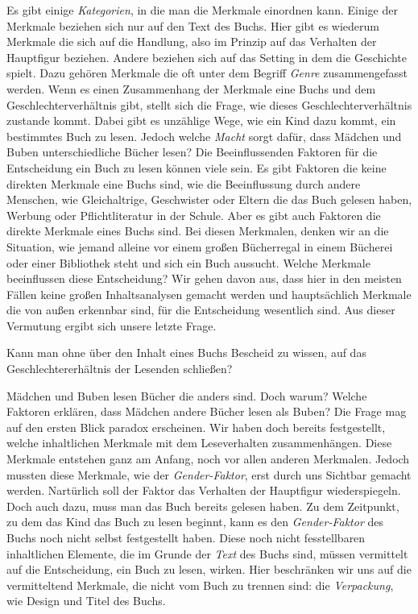 Es gibt einige \emph{Kategorien}, in die man die Merkmale einordnen
kann. Einige der Merkmale beziehen sich nur auf den Text des Buchs. Hier
gibt es wiederum Merkmale die sich auf die Handlung, also im Prinzip auf
das Verhalten der Hauptfigur beziehen. Andere beziehen sich auf das
Setting in dem die Geschichte spielt. Dazu gehören \zB Merkmale die oft
unter dem Begriff \emph{Genre} zusammengefasst werden. Wenn es einen
Zusammenhang der Merkmale eine Buchs und dem Geschlechterverhältnis
gibt, stellt sich die Frage, wie dieses Geschlechterverhältnis zustande
kommt. Dabei gibt es unzählige Wege, wie ein Kind dazu kommt, ein
bestimmtes Buch zu lesen. Jedoch welche \emph{Macht} sorgt dafür, dass
Mädchen und Buben unterschiedliche Bücher lesen? Die Beeinflussenden
Faktoren für die Entscheidung ein Buch zu lesen können viele sein. Es
gibt Faktoren die keine direkten Merkmale eine Buchs sind, wie \zB die
Beeinflussung durch andere Menschen, wie Gleichaltrige, Geschwister oder
Eltern die das Buch gelesen haben, Werbung oder Pflichtliteratur in der
Schule. Aber es gibt auch Faktoren die direkte Merkmale eines Buchs
sind. Bei diesen Merkmalen, denken wir an die Situation, wie jemand
alleine vor einem großen Bücherregal in einem Bücherei oder einer
Bibliothek steht und sich ein Buch aussucht. Welche Merkmale
beeinflussen diese Entscheidung? Wir gehen davon aus, dass hier in den
meisten Fällen keine großen Inhaltsanalysen gemacht werden und
hauptsächlich Merkmale die von außen erkennbar sind, für die
Entscheidung wesentlich sind. Aus dieser Vermutung ergibt sich unsere
letzte Frage.

\begin{frage}\label{fra:merkmale}
Kann man ohne über den Inhalt eines Buchs Bescheid zu wissen, auf das Geschlechtererhältnis der Lesenden schließen?
\end{frage}

Mädchen und Buben lesen Bücher die anders sind. Doch warum? Welche
Faktoren erklären, dass Mädchen andere Bücher lesen als Buben? Die Frage
mag auf den ersten Blick paradox erscheinen. Wir haben doch bereits
festgestellt, welche inhaltlichen Merkmale mit dem Leseverhalten
zusammenhängen. Diese Merkmale entstehen ganz am Anfang, noch vor allen
anderen Merkmalen. Jedoch mussten diese Merkmale, wie \zB der
\emph{Gender-Faktor}, erst durch uns Sichtbar gemacht werden. Nartürlich
soll der Faktor das Verhalten der Hauptfigur wiederspiegeln. Doch auch
dazu, muss man das Buch bereits gelesen haben. Zu dem Zeitpunkt, zu dem
das Kind das Buch zu lesen beginnt, kann es den \emph{Gender-Faktor} des
Buchs noch nicht selbst festgestellt haben. Diese noch nicht
fesstellbaren inhaltlichen Elemente, die im Grunde der \emph{Text} des
Buchs sind, müssen vermittelt auf die Entscheidung, ein Buch zu lesen,
wirken. Hier beschränken wir uns auf die vermitteltend Merkmale, die
nicht vom Buch zu trennen sind: die \emph{Verpackung}, wie \zB Design
und Titel des Buchs.

